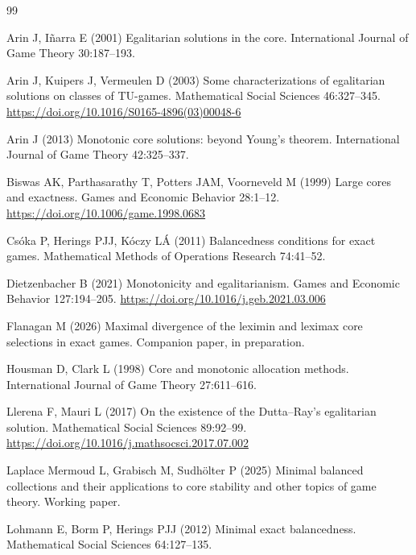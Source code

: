 \documentclass[11pt]{article}
\begin{document}
\begin{thebibliography}{99}

Arin J, I\~narra E (2001) Egalitarian solutions in the core.
International Journal of Game Theory 30:187--193.

Arin J, Kuipers J, Vermeulen D (2003) Some characterizations of egalitarian
solutions on classes of TU-games. Mathematical Social Sciences 46:327--345.
\url{https://doi.org/10.1016/S0165-4896(03)00048-6}

Arin J (2013) Monotonic core solutions: beyond Young's theorem.
International Journal of Game Theory 42:325--337.

Biswas AK, Parthasarathy T, Potters JAM, Voorneveld M (1999) Large cores and
exactness. Games and Economic Behavior 28:1--12.
\url{https://doi.org/10.1006/game.1998.0683}

Cs\'oka P, Herings PJJ, K\'oczy L\'A (2011) Balancedness conditions for exact
games. Mathematical Methods of Operations Research 74:41--52.

Dietzenbacher B (2021) Monotonicity and egalitarianism.
Games and Economic Behavior 127:194--205.
\url{https://doi.org/10.1016/j.geb.2021.03.006}

Flanagan M (2026) Maximal divergence of the leximin and leximax core
selections in exact games. Companion paper, in preparation.

Housman D, Clark L (1998) Core and monotonic allocation methods.
International Journal of Game Theory 27:611--616.

Llerena F, Mauri L (2017) On the existence of the Dutta--Ray's egalitarian
solution. Mathematical Social Sciences 89:92--99.
\url{https://doi.org/10.1016/j.mathsocsci.2017.07.002}

Laplace Mermoud L, Grabisch M, Sudh\"olter P (2025) Minimal balanced
collections and their applications to core stability and other topics of
game theory. Working paper.

Lohmann E, Borm P, Herings PJJ (2012) Minimal exact balancedness.
Mathematical Social Sciences 64:127--135.


\end{thebibliography}
\end{document}
